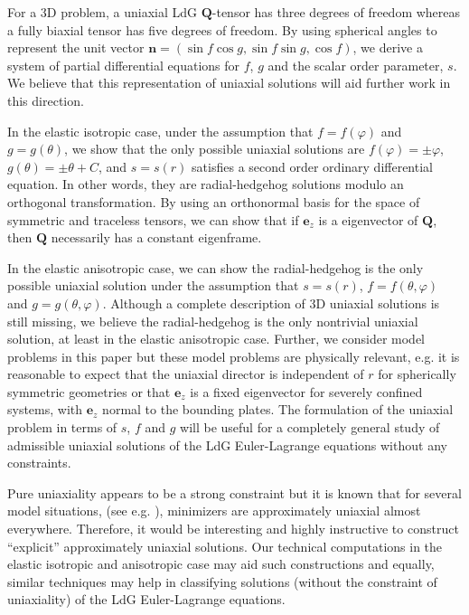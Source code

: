 \documentclass[10pt, a4paper]{article}
\newcommand\n{\mathbf{n}}
\newcommand\e{\mathbf{e}}
\newcommand\Qvec{\mathbf{Q}}
\newcommand\pp{\partial}
\begin{document}
For a 3D problem, a uniaxial LdG $\Qvec$-tensor has three degrees of freedom whereas a fully biaxial tensor has five degrees of freedom. By using spherical angles to represent the unit vector $\n = (\sin f \cos g, \sin f \sin g, \cos f)$, we derive a system of partial differential equations for $f$, $g$ and the scalar order parameter, $s$. We believe that this representation of uniaxial solutions will aid further work in this direction.

In the elastic isotropic case, under the assumption that  $f = f(\varphi)$ and $g = g(\theta)$, we show that the only possible uniaxial solutions are $f(\varphi) = \pm \varphi$, $g(\theta) = \pm \theta + C$, and $s = s(r)$ satisfies a second order ordinary differential equation.
In other words, they are radial-hedgehog solutions modulo an orthogonal transformation. 
By using an orthonormal basis for the space of symmetric and traceless tensors, we can show that if $\e_z$ is a eigenvector of $\Qvec$, %
then $\Qvec$ necessarily has a constant eigenframe. 

In the elastic anisotropic case, we can show the radial-hedgehog is the only possible uniaxial solution under the assumption that $s = s(r)$, $f = f(\theta, \varphi)$ and $g = g(\theta, \varphi)$. Although a complete description of 3D uniaxial solutions is still missing, we believe the radial-hedgehog is the only nontrivial uniaxial solution, at least in the elastic anisotropic case. Further, we consider model problems in this paper but these model problems are physically relevant, e.g. it is reasonable to expect that the uniaxial director is independent of $r$ for spherically symmetric geometries or that $\mathbf{e}_z$ is a fixed eigenvector for severely confined systems, with $\mathbf{e}_z$ normal to the bounding plates. The formulation of the uniaxial problem in terms of $s$, $f$ and $g$ will be useful for a completely general study of admissible uniaxial solutions of the LdG Euler-Lagrange equations without any constraints.

Pure uniaxiality appears to be a strong constraint but it is known that for several model situations, (see e.g. \cite{amaz, henaomajumdarpisante2017}), minimizers are approximately uniaxial almost everywhere. Therefore, it would be interesting and highly instructive to construct ``explicit'' approximately uniaxial solutions. Our technical computations in the elastic isotropic and anisotropic case may aid such constructions and equally, similar techniques may help in classifying solutions (without the constraint of uniaxiality) of the LdG Euler-Lagrange equations.
\end{document}
